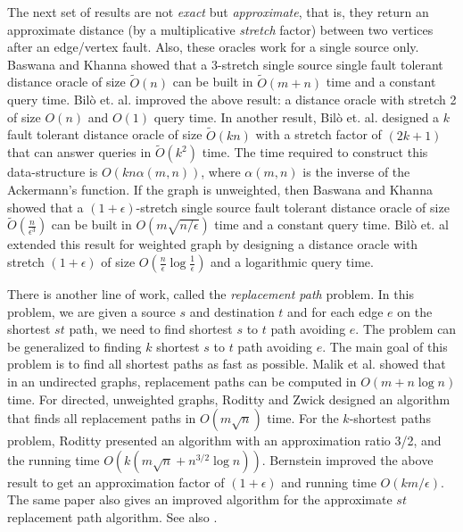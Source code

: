 The next set of results are not {\em exact} but {\em approximate},
that is, they return
an approximate distance (by a multiplicative {\em stretch}
factor)
between two vertices after an edge/vertex fault. Also, these
oracles work  for a  single source only. Baswana and Khanna
\cite{KhannaB10} showed
that a 3-stretch  single source single fault tolerant distance
oracle of size $\tilde O(n)$ can be built in
$\tilde O(m + n)$ time and a constant query time.
Bil{\`{o}} et. al.\cite{BiloGLP16} improved the above result:
a distance oracle with stretch 2 of size
$O(n)$ and $O(1)$ query time.
In another result, Bil{\`{o}} et. al. \cite{BiloG0P16}
designed a $k$ fault
tolerant distance oracle of size $ \tilde O(kn)$ with a
stretch factor of $(2k+1)$
that can answer queries in $\tilde O(k^2)$ time. The time
required to construct this
data-structure is $ O(kn\alpha(m, n))$, where $\alpha(m,n)$
is the inverse of the Ackermann's function.
If the graph is unweighted,
then Baswana and Khanna\cite{KhannaB10}  showed that a $(1+\epsilon)$-stretch
single source
fault tolerant distance oracle of size $\tilde O(\frac{n}{\epsilon^3})$
can be built in $O(m \sqrt{n/\epsilon})$ time
and  a constant query time.  Bil{\`{o}} et. al \cite{BiloGLP16}
extended this result for
weighted graph by designing a distance oracle with stretch
$(1+\epsilon)$ of size
$O(\frac{n}{\epsilon} \log \frac{1}{\epsilon} )$ and a logarithmic
query time.

There is another line of work, called the {\em replacement
path} problem. In this problem,   we are given a source
$s$ and destination $t$ and for each edge $e$ on the shortest
 $st$ path, we need to find shortest $s$ to $t$ path
avoiding $e$. The problem can be generalized to finding
$k$ shortest $s$ to $t$ path avoiding $e$. The main goal
of this problem is to find all  shortest paths as fast
as possible.
Malik et al. \cite{MalikMG89}  showed that in an undirected
graphs, replacement paths can be computed in
 $O(m + n \log n)$ time. For
 directed, unweighted graphs, Roditty and Zwick \cite{RoddityZ12}
designed an algorithm that  finds all
replacement paths in $O(m
\sqrt n)$ time.
For the $k$-shortest paths problem, Roditty \cite{Roditty07}
presented
an algorithm with an approximation ratio
3/2, and the running time  $O(k(m\sqrt n+n^{3/2}
\log n))$.
 Bernstein \cite{Bernstein10} improved the above result
to get an approximation factor of $(1+\epsilon)$ and running
time $O(km/\epsilon)$.  The same paper also gives an improved
algorithm for the approximate $st$ replacement path algorithm.
See also \cite{GrandoniW12,Williams11,WeimannY10}.



